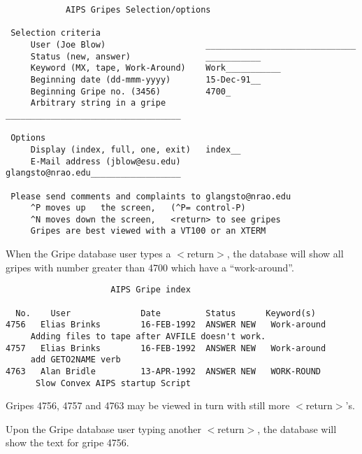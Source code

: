 \begin{center}
\begin{verbatim}
		    AIPS Gripes Selection/options

 Selection criteria
     User (Joe Blow)                    ______________________________
     Status (new, answer)               ___________
     Keyword (MX, tape, Work-Around)    Work___________
     Beginning date (dd-mmm-yyyy)       15-Dec-91__
     Beginning Gripe no. (3456)	        4700_
     Arbitrary string in a gripe        ___________________________________

 Options
     Display (index, full, one, exit)   index__
     E-Mail address (jblow@esu.edu)     glangsto@nrao.edu__________________

 Please send comments and complaints to glangsto@nrao.edu
     ^P moves up   the screen,   (^P= control-P)
     ^N moves down the screen,   <return> to see gripes
     Gripes are best viewed with a VT100 or an XTERM

\end{verbatim}
\end{center}

When the Gripe database user types a $<$return$>$, the database will
show all gripes with number greater than 4700 which have a
``work-around''.

\begin{center}
\begin{verbatim}
                     AIPS Gripe index

  No.    User              Date         Status      Keyword(s)
4756   Elias Brinks        16-FEB-1992  ANSWER NEW   Work-around
     Adding files to tape after AVFILE doesn't work.
4757   Elias Brinks        16-FEB-1992  ANSWER NEW   Work-around
     add GETO2NAME verb
4763   Alan Bridle         13-APR-1992  ANSWER NEW   WORK-ROUND
      Slow Convex AIPS startup Script
\end{verbatim}
\end{center}

Gripes 4756, 4757 and 4763 may be viewed in turn with still more
$<$return$>$'s.

\clearpage
Upon the Gripe database user typing another $<$return$>$,
the database will show the text for gripe 4756.

